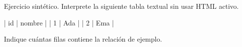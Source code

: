 Ejercicio sintético. Interprete la siguiente tabla textual sin usar HTML activo.

| id | nombre |
| 1  | Ada    |
| 2  | Ema    |

Indique cuántas filas contiene la relación de ejemplo.
